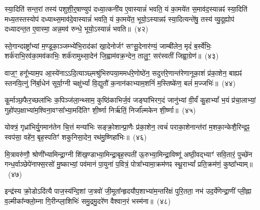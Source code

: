 स्या॒दिति॑ सन्त॒रां तस्य॑ पशुशी॒र्॒\mbox{}षाण्युप॑ दध्या॒त्कनी॑य ए॒वास्यान्नं॑ भवति॒ यं का॒मये॑त स॒माव॑द॒स्यान्नꣴ॑ स्या॒दिति॑ मध्य॒तस्तस्योप॑ दध्याथ्स॒माव॑दे॒वास्यान्नं॑ भवति॒ यं का॒मये॑त॒ भूयो॒\-ऽस्यान्नꣴ॑ स्या॒दित्यन्ते॑षु॒ तस्य॑ व्यु॒दूह्योप॑ दध्यादन्त॒त ए॒वास्मा॒ अन्न॒मव॑ रुन्धे॒ भूयो॒\-ऽस्यान्नं॑ भवति॥~(४२)\ip

{\anuvakamend[{ए॒न॒म॒स्यान्न॒म्भूयो॒स्यान्नं॑ भवति}]}%

स्ते॒गान्दꣴष्ट्रा᳚भ्यां म॒ण्डूका॒ञ्जम्भ्ये॑भि॒राद॑कां खा॒देनोर्जꣳ॑ सꣳसू॒देनार॑ण्यं॒ जाम्बी॑लेन॒ मृदं॑ ब॒र्स्वे॑भिः॒ शर्क॑राभि॒रव॑का॒मव॑काभिः॒ शर्क॑रामुथ्सा॒देन॑ जि॒ह्वाम॑वक्र॒न्देन॒ तालु॒ꣳ॒ सर॑स्वतीं जिह्वा॒ग्रेण॑॥~(४३)\ip

{\anuvakamend[{स्ते॒गान्द्वाविꣳ॑शतिः}]}%

वाज॒ꣳ॒ हनू᳚भ्याम॒प आ॒स्ये॑ना\-ऽऽदि॒त्याञ्छ्मश्रु॑भिरुपया॒ममध॑रे॒णोष्ठे॑न॒ सदुत्त॑रे॒णान्त॑रेणा\-नूका॒शं प्र॑का॒शेन॒ बाह्यꣴ॑ स्तनयि॒त्नुं नि॑र्बा॒धेन॑ सूर्या॒ग्नी चक्षु॑र्भ्यां वि॒द्युतौ॑ क॒नान॑काभ्याम॒शनिं॑ म॒स्तिष्के॑ण॒ बलं॑ म॒ज्जभिः॑॥~(४४)\ip

{\anuvakamend[{वाजं॒ पञ्च॑विꣳशतिः}]}%

कू॒र्माञ्छ॒फैर॒च्छला॑भिः क॒पिञ्ज॑ला॒न्थ्साम॒ कुष्ठि॑काभिर्ज॒वं जङ्घा॑भिरग॒दं जानु॑भ्यां वी॒र्यं॑ कु॒हा\-भ्यां᳚ भ॒यं प्र॑चा॒लाभ्यां॒ गुहो॑पप॒क्षाभ्या॑म॒श्विना॒वꣳसा᳚भ्या॒मदि॑तिꣳ शी॒र्ष्णा निर्\mbox{}ऋ॑तिं॒ निर्जा᳚ल्मकेन शी॒र्ष्णा॥~(४५)\ip

{\anuvakamend[{कू॒र्मान्त्रयो॑विꣳशतिः}]}%

योक्त्रं॒ गृध्रा॑भिर्यु॒गमान॑तेन चि॒त्तं मन्या॑भिः सङ्क्रो॒शान्प्रा॒णैः प्र॑का॒शेन॒ त्वचं॑ पराका॒शेनान्त॑रां म॒शका॒न्केशै॒रिन्द्र॒ꣴ॒ स्वप॑सा॒ वहे॑न॒ बृह॒स्पतिꣳ॑ शकुनिसा॒देन॒ रथ॑मु॒ष्णिहा॑भिः॥~(४६)\ip

{\anuvakamend[{योक्त्र॒मेक॑विꣳशतिः}]}%

मि॒त्रावरु॑णौ॒ श्रोणी᳚भ्यामिन्द्रा॒ग्नी शि॑ख॒ण्डाभ्या॒मिन्द्रा॒बृह॒स्पती॑ ऊ॒रुभ्या॒मिन्द्रा॒विष्णू॑ अष्ठी॒वद्भ्याꣳ॑ सवि॒तारं॒ पुच्छे॑न गन्ध॒र्वाञ्छेपे॑नाफ्स॒रसो॑ मु॒ष्काभ्यां॒ पव॑मानं पा॒युना॑ प॒वित्रं॒ पोत्रा᳚भ्यामा॒क्रम॑णꣴ स्थू॒रा\-भ्यां᳚ प्रति॒क्रम॑णं॒ कुष्ठा᳚भ्याम्॥~(४७)\ip

{\anuvakamend[{}]}%

इन्द्र॑स्य क्रो॒डो\-ऽदि॑त्यै पाज॒स्य॑न्दि॒शां ज॒त्रवो॑ जी॒मूता᳚न्हृदयौप॒शाभ्या॑म॒न्तरि॑क्षं पुरि॒तता॒ नभ॑ उद॒र्ये॑णेन्द्रा॒णीं प्ली॒ह्ना व॒ल्मीका᳚न्क्लो॒म्ना गि॒रीन्प्ला॒शिभिः॑ समु॒द्रमु॒दरे॑ण वैश्वान॒रं भस्म॑ना॥~(४८)\ip

{\anuvakamend[{मि॒त्रावरु॑णा॒विन्द्र॑स्य॒ द्वाविꣳ॑शति॒र्द्वाविꣳ॑शतिः}]}%

